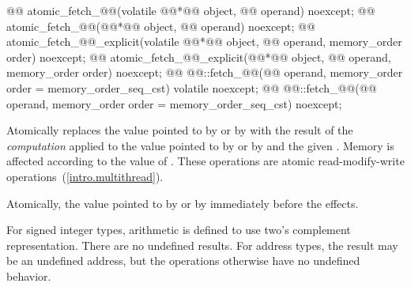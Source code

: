 %
%
%
%
%
%
%
%
%
%
%
%
%
%
%
%
%
\begin{itemdecl}
@@ atomic_fetch_@@(volatile @@*@\itcorr[-1]@ object, @@ operand) noexcept;
@@ atomic_fetch_@@(@@*@\itcorr[-1]@ object, @@ operand) noexcept;
@@ atomic_fetch_@@_explicit(volatile @@*@\itcorr[-1]@ object, @@ operand, memory_order order) noexcept;
@@ atomic_fetch_@@_explicit(@@*@\itcorr[-1]@ object, @@ operand, memory_order order) noexcept;
@@ @@::fetch_@@(@@ operand, memory_order order = memory_order_seq_cst) volatile noexcept;
@@ @@::fetch_@@(@@ operand, memory_order order = memory_order_seq_cst) noexcept;
\end{itemdecl}

\begin{itemdescr}
\pnum
\effects Atomically replaces the value pointed to by  or by
 with the result of the \textit{computation} applied to the
value pointed to by  or by  and the given .
Memory is affected according to the value of .
These operations are atomic read-modify-write operations~(\ref{intro.multithread}).

\pnum
\returns Atomically, the value pointed to by  or by  immediately before the effects.

\pnum
{}%
\remarks For signed integer types, arithmetic is defined to use two's complement
representation. There are no undefined results. For address types, the result may be an
undefined address, but the operations otherwise have no undefined behavior.
\end{itemdescr}

